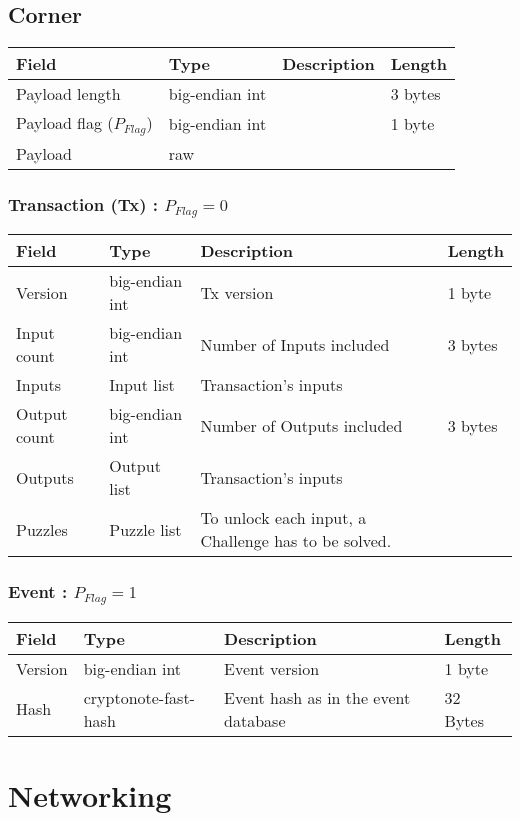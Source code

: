 \documentclass[a4paper,10pt]{article}
\begin{document}
        \subsection{Corner}
           \begin{tabularx}{\textwidth}{|l|l|X|l|}
            \hline Field & Type & Description & Length \\ \hline
            \hline Payload length & big-endian int &  & 3 bytes \\
            \hline Payload flag ($P_{Flag}$) & big-endian int &  & 1 byte \\
            \hline Payload & raw & & \\
            \hline
            \end{tabularx}
            \subsubsection{Transaction (Tx) :  $P_{Flag} = 0$}
                \begin{tabularx}{\textwidth}{|l|l|X|l|}
                \hline Field & Type & Description & Length \\ \hline
                \hline Version & big-endian int & Tx version & 1 byte \\
                \hline Input count & big-endian int & Number of Inputs included & 3 bytes\\
                \hline Inputs & Input list & Transaction's inputs & \\
                \hline Output count & big-endian int & Number of Outputs included & 3 bytes\\
                \hline Outputs & Output list & Transaction's inputs & \\
                \hline Puzzles & Puzzle list & To unlock each input, a Challenge has to be solved. & \\
                \hline
                \end{tabularx}
            \subsubsection{Event : $P_{Flag} = 1$}
                \begin{tabularx}{\textwidth}{|l|l|X|l|}
                \hline Field & Type & Description & Length \\ \hline
                \hline Version & big-endian int & Event version & 1 byte \\
                \hline Hash & cryptonote-fast-hash & Event hash as in the event database & 32 Bytes\\
                \hline
                \end{tabularx}


    \section{Networking}
\end{document}
